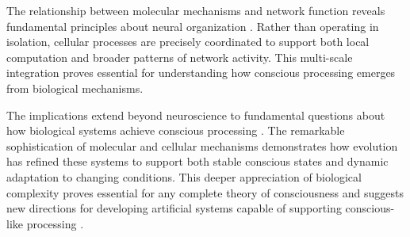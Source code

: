 The relationship between molecular mechanisms and network function reveals fundamental principles about neural organization \cite{Lisman2018}. Rather than operating in isolation, cellular processes are precisely coordinated to support both local computation and broader patterns of network activity. This multi-scale integration proves essential for understanding how conscious processing emerges from biological mechanisms.

The implications extend beyond neuroscience to fundamental questions about how biological systems achieve conscious processing \cite{Yu2018}. The remarkable sophistication of molecular and cellular mechanisms demonstrates how evolution has refined these systems to support both stable conscious states and dynamic adaptation to changing conditions. This deeper appreciation of biological complexity proves essential for any complete theory of consciousness and suggests new directions for developing artificial systems capable of supporting conscious-like processing \cite{Zador2019}.